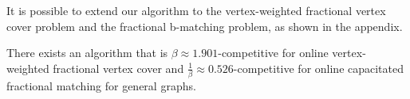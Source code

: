 \documentclass{article}
\begin{document}
%

It is possible to extend our algorithm to the vertex-weighted fractional vertex cover problem and the fractional b-matching problem, as shown in the appendix.
\begin{theorem}
\label{thm:vertexweighted}
There exists an algorithm that is $\beta\approx 1.901$-competitive for online vertex-weighted fractional vertex cover and $\frac{1}{\beta}\approx 0.526$-competitive for online capacitated fractional matching for general graphs.
\end{theorem}
\end{document}
